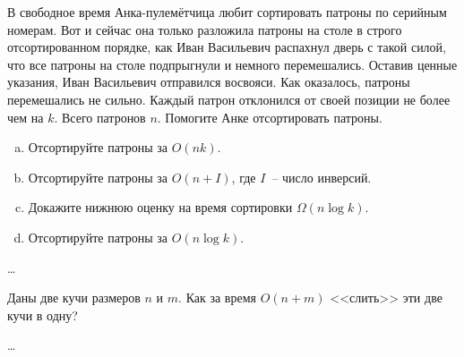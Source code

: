 
\begin{problem}
    В свободное время Анка-пулемётчица любит сортировать патроны по серийным номерам.
    Вот и сейчас она только разложила патроны на столе в строго отсортированном порядке, как Иван Васильевич распахнул дверь
    с такой силой, что все патроны на столе подпрыгнули и немного перемешались. Оставив ценные указания, Иван Васильевич отправился восвояси.
    Как оказалось, патроны перемешались не сильно. Каждый патрон отклонился от своей позиции не более чем на $k$. Всего патронов $n$.
    Помогите Анке отсортировать патроны.

    \begin{enumerate}[a)]
        \item Отсортируйте патроны за $O(nk)$.
        \item Отсортируйте патроны за $O(n + I)$, где $I$~-- число инверсий.
        \item Докажите нижнюю оценку на время сортировки $\Omega(n \log k)$.
        \item Отсортируйте патроны за $O(n \log k)$.
    \end{enumerate}
\end{problem}

\begin{solution}
    \dots
\end{solution}


\begin{problem}
    Даны две кучи размеров $n$ и $m$. Как за время $O(n + m)$ <<слить>> эти две кучи в одну?
\end{problem}

\begin{solution}
    \dots
\end{solution}


